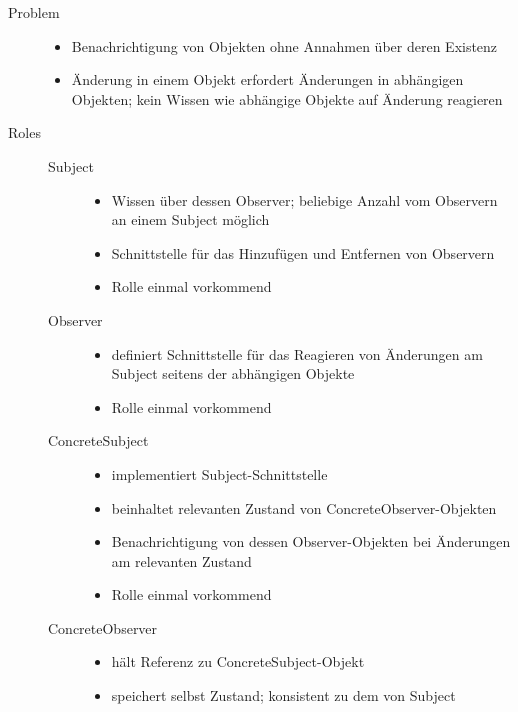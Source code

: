 \begin{description}
    \item[Problem] \hfill 
    \begin{itemize}
        \item Benachrichtigung von Objekten ohne Annahmen über deren Existenz
        \item Änderung in einem Objekt erfordert Änderungen in abhängigen Objekten; kein Wissen wie abhängige Objekte auf Änderung reagieren
    \end{itemize}
    \item[Roles] \hfill
    \begin{description}
        \item[Subject] \hfill 
        \begin{itemize}
            \item Wissen über dessen Observer; beliebige Anzahl vom Observern an einem Subject möglich
            \item Schnittstelle für das Hinzufügen und Entfernen von Observern
            \item Rolle einmal vorkommend 
        \end{itemize}
        \item[Observer] \hfill 
        \begin{itemize}
            \item definiert Schnittstelle für das Reagieren von Änderungen am Subject seitens der abhängigen Objekte
            \item Rolle einmal vorkommend  
        \end{itemize}
        \item[ConcreteSubject] \hfill 
        \begin{itemize}
            \item implementiert Subject-Schnittstelle
            \item beinhaltet relevanten Zustand von ConcreteObserver-Objekten
            \item Benachrichtigung von dessen Observer-Objekten bei Änderungen am relevanten Zustand
            \item Rolle einmal vorkommend  
        \end{itemize}
        \item[ConcreteObserver] \hfill 
        \begin{itemize}
            \item hält Referenz zu ConcreteSubject-Objekt
            \item speichert selbst Zustand; konsistent zu dem von Subject

\end{itemize}
\end{description}
\end{description}

